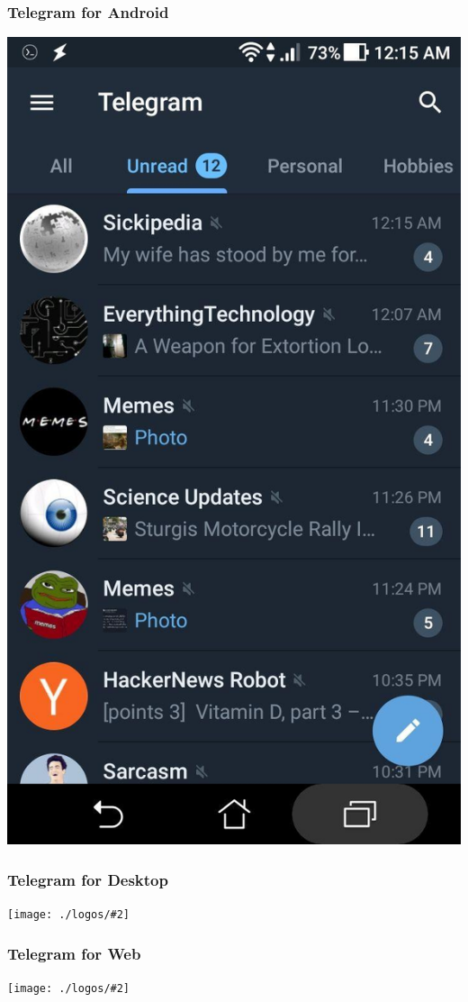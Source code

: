 \documentclass[17pt]{beamer}
\newcommand{\frontpic}[2]{\begin{frame}
		\frametitle{#1}
		\texttt{[image: ./logos/\#2]}
	\end{frame}
}
\begin{document}
	\begin{frame}
			\frametitle{Telegram for Android}
			\begin{center}
				\includegraphics[height=0.9\textheight]{./logos/telegram-front}
			\end{center}
	\end{frame}
	
	\frontpic{Telegram for Desktop}{telegram-2nd}
	
	\frontpic{Telegram for Web}{telegram-web}
	
\end{document}
